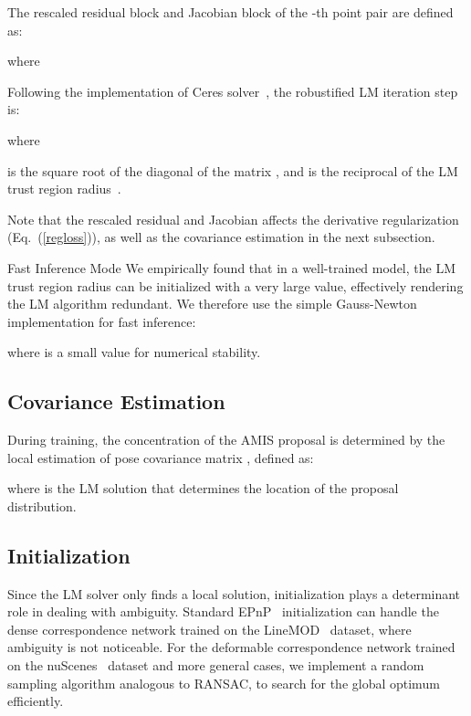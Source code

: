 \documentclass[10pt,twocolumn,letterpaper]{article}
\makeatletter
\renewcommand{\paragraph}{
  \@startsection{paragraph}{4}
  {\z@}{1.0ex \@plus 0ex \@minus .3ex}{-1em}
  {\normalfont\normalsize\bfseries}
}
\makeatother
\begin{document}
The rescaled residual block  and Jacobian block  of the -th point pair are defined as:


where


Following the implementation of Ceres solver~\cite{ceres-solver}, the robustified LM iteration step is:

where

 is the square root of the diagonal of the matrix , and  is the reciprocal of the LM trust region radius~\cite{ceres-solver}.


Note that the rescaled residual and Jacobian affects the derivative regularization (Eq.~(\ref{regloss})), as well as the covariance estimation in the next subsection.

\paragraph{Fast Inference Mode} We empirically found that in a well-trained model, the LM trust region radius can be initialized with a very large value, effectively rendering the LM algorithm redundant. We therefore use the simple Gauss-Newton implementation for fast inference:

where  is a small value for numerical stability.

\subsection{Covariance Estimation}
During training, the concentration of the AMIS proposal is determined by the local estimation of pose covariance matrix , defined as:

where  is the LM solution that determines the location of the proposal distribution.

\subsection{Initialization}
\label{rslm}

Since the LM solver only finds a local solution, initialization plays a determinant role in dealing with ambiguity. Standard EPnP~\cite{EPnP} initialization can handle the dense correspondence network trained on the LineMOD~\cite{linemod} dataset, where ambiguity is not noticeable. For the deformable correspondence network trained on the nuScenes~\cite{nuscenes} dataset and more general cases, we implement a random sampling algorithm analogous to RANSAC, to search for the global optimum efficiently.
\end{document}
